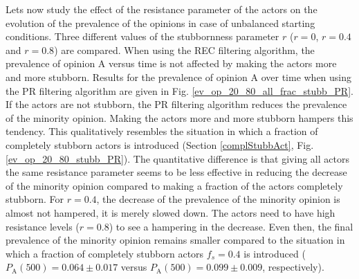 \documentclass[11 pt , letterpaper , twoside , openright]{book}
\begin{document}
Lets now study the effect of the resistance parameter of the actors on the evolution of the prevalence of the opinions in case of unbalanced starting conditions. Three different values of the stubbornness parameter $r$ ($r=0$, $r=0.4$ and $r=0.8$) are compared. When using the REC filtering algorithm, the prevalence of opinion A versus time is not affected by making the actors more and more stubborn. Results for the prevalence of opinion A over time when using the PR filtering algorithm are given in Fig. \ref{ev_op_20_80_all_frac_stubb_PR}. If the actors are not stubborn, the PR filtering algorithm reduces the prevalence of the minority opinion. Making the actors more and more stubborn hampers this tendency. This qualitatively resembles the situation in which a fraction of completely stubborn actors is introduced (Section \ref{complStubbAct}, Fig. \ref{ev_op_20_80_stubb_PR}). The quantitative difference is that giving all actors the same resistance parameter seems to be less effective in reducing the decrease of the minority opinion compared to making a fraction of the actors completely stubborn. For $r=0.4$, the decrease of the prevalence of the minority opinion is almost not hampered, it is merely slowed down. The actors need to have high resistance levels ($r=0.8$) to see a hampering in the decrease. Even then, the final prevalence of the minority opinion remains smaller compared to the situation in which a fraction of completely stubborn actors $f_s=0.4$ is introduced ($P_\text{A}(500) = 0.064 \pm 0.017$ versus $P_\text{A}(500) = 0.099 \pm 0.009$, respectively).
\newpage
\end{document}

